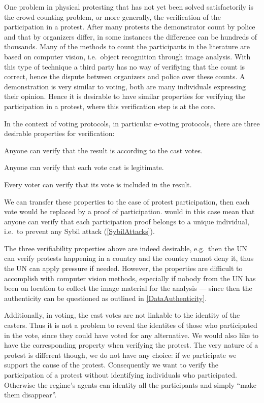 One problem in physical protesting that has not yet been solved satisfactorily 
is the crowd counting problem, or more generally, the verification of the 
participation in a protest.
After many protests the demonstrator count by police and that by organizers 
differ, in some instances the difference can be hundreds of thousands.
Many of the methods to count the participants in the literature are based on 
computer vision, i.e.\ object recognition through image analysis.
With this type of technique a third party has no way of verifiying that the 
count is correct, hence the dispute between organizers and police over these 
counts.
A demonstration is very similar to voting, both are many individuals expressing 
their opinion.
Hence it is desirable to have similar properties for verifying the 
participation in a protest, where this verification step is at the core.

In the context of voting protocols, in particular e-voting protocols, there are 
three desirable properties for verification:
\begin{properties}
\item\label{UniversalVerif} Anyone can verify that the result is according to 
  the cast votes.
\item\label{EligibilityVerif} Anyone can verify that each vote cast is 
  legitimate.
\item\label{IndividualVerif} Every voter can verify that its vote is included 
  in the result.
\end{properties}
We can transfer these properties to the case of protest participation, then 
each vote would be replaced by a proof of participation.
 would in this case mean that anyone can verify that 
each participation proof belongs to a unique individual, i.e.\ to prevent any 
Sybil attack (\cref{SybilAttacks}).

The three verifiability properties above are indeed desirable, e.g.\ then the 
\ac{UN} can verify protests happening in a country and the country cannot deny 
it, thus the \ac{UN} can apply pressure if needed.
However, the properties are difficult to accomplish with computer vision 
methods, especially if nobody from the \ac{UN} has been on location to collect 
the image material for the analysis --- since then the authenticity can be 
questioned as outlined in \cref{DataAuthenticity}.

Additionally, in voting, the cast votes are not linkable to the identity of the 
casters.
Thus it is not a problem to reveal the identites of those who participated in 
the vote, since they could have voted for any alternative.
We would also like to have the corresponding property when verifying the 
protest.
The very nature of a protest is different though, we do not have any choice: if 
we participate we support the cause of the protest.
Consequently we want to verify the participation of a protest without 
identifying individuals who participated.
Otherwise the regime's agents can identity all the participants and simply 
\enquote{make them disappear}.

